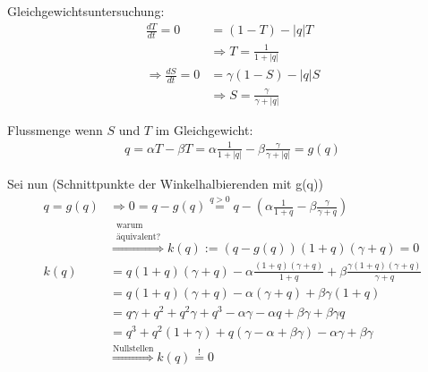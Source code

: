 \documentclass[11pt,a4paper]{article}
\begin{document}
	\newpage	
	
	Gleichgewichtsuntersuchung:
	\begin{align*}
		\frac{dT}{dt} = 0 &= \left(1 - T\right) - \left|q\right|T \\
		&\Rightarrow T = \frac{1}{1+|q|} \\
		\Rightarrow \frac{dS}{dt} = 0 &= \gamma \left(1 - S\right) - \left|q\right|S \\
		&\Rightarrow S = \frac{\gamma}{\gamma + |q|}
	\end{align*}
	
	Flussmenge wenn \(S\) und \(T\) im Gleichgewicht:
	\begin{align*}
		q = \alpha T - \beta T = \alpha \frac{1}{1+|q|} - \beta \frac{\gamma}{\gamma + |q|} = g(q)
	\end{align*}
	
	Sei nun (Schnittpunkte der Winkelhalbierenden mit g(q))
	\begin{align*}
		q = g(q) &\Rightarrow 0 = q - g(q) \stackrel{q > 0}{=}  q - \left(\alpha \frac{1}{1+q} - \beta \frac{\gamma}{\gamma + q} \right) \\
		& \stackrel{\substack{\textrm{warum}\\\textrm{äquivalent?}}}{\Rightarrow}
		k(q) := \left( q - g(q) \right) (1+q) (\gamma + q) = 0 \\
		k(q) &= q(1+q) (\gamma + q) - \alpha \frac{(1+q) (\gamma + q)}{1+q} + \beta \frac{\gamma (1+q) (\gamma + q)}{\gamma + q} \\
		&= q(1+q) (\gamma + q) - \alpha (\gamma + q) + \beta \gamma (1+q) \\
		&= q \gamma + q^2 + q^2 \gamma + q^3 - \alpha \gamma - \alpha q + \beta \gamma + \beta \gamma q \\
		&= q^3 + q^2(1 + \gamma) + q(\gamma - \alpha + \beta \gamma) - \alpha \gamma + \beta \gamma \\
		& \stackrel{\textrm{Nullstellen}}{\Rightarrow} k(q) \stackrel{!}{=} 0
	\end{align*}
	
\end{document}
